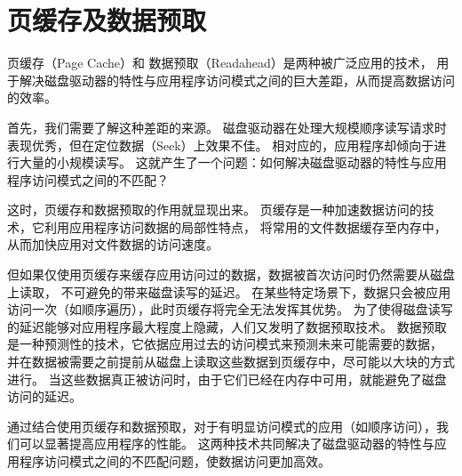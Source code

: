 \section{页缓存及数据预取}
页缓存（Page Cache）\parencite{tanenbaum2014modern,ostep,bovet2005understanding}和
数据预取（Readahead）\parencite{readahead,sequential_prefetching}是两种被广泛应用的技术，
用于解决磁盘驱动器的特性与应用程序访问模式之间的巨大差距，从而提高数据访问的效率。

首先，我们需要了解这种差距的来源。
磁盘驱动器在处理大规模顺序读写请求时表现优秀，但在定位数据（Seek）上效果不佳。
相对应的，应用程序却倾向于进行大量的小规模读写。\parencite{smith2018understanding,wang2017analyzing,garcia2019investigating}
这就产生了一个问题：如何解决磁盘驱动器的特性与应用程序访问模式之间的不匹配？

这时，页缓存和数据预取的作用就显现出来。
页缓存是一种加速数据访问的技术，它利用应用程序访问数据的局部性特点，
将常用的文件数据缓存至内存中，从而加快应用对文件数据的访问速度。

但如果仅使用页缓存来缓存应用访问过的数据，数据被首次访问时仍然需要从磁盘上读取，
不可避免的带来磁盘读写的延迟。
在某些特定场景下，数据只会被应用访问一次（如顺序遍历），此时页缓存将完全无法发挥其优势。
为了使得磁盘读写的延迟能够对应用程序最大程度上隐藏，人们又发明了数据预取技术。
数据预取是一种预测性的技术，它依据应用过去的访问模式来预测未来可能需要的数据，
并在数据被需要之前提前从磁盘上读取这些数据到页缓存中，尽可能以大块的方式进行。
当这些数据真正被访问时，由于它们已经在内存中可用，就能避免了磁盘访问的延迟。

通过结合使用页缓存和数据预取，对于有明显访问模式的应用（如顺序访问），我们可以显著提高应用程序的性能。
这两种技术共同解决了磁盘驱动器的特性与应用程序访问模式之间的不匹配问题，使数据访问更加高效。



